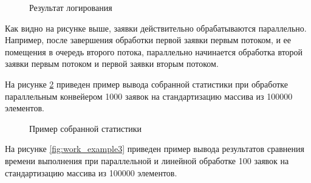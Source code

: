\begin{figure}[h!]
	
	
	\caption{Результат логирования}
	
	\label{fig:work_example2}
	
\end{figure}


Как видно на рисунке выше, заявки действительно обрабатываются параллельно. Например, после завершения обработки первой заявки первым потоком, и ее помещения в очередь второго потока, параллельно начинается обработка второй заявки первым потоком и первой заявки вторым потоком.

На рисунке \ref{fig:stats2} приведен пример вывода собранной статистики при обработке параллельным конвейером 1000 заявок на стандартизацию массива из 100000 элементов.

\begin{figure}[h!]
	
	
	\caption{Пример собранной статистики}
	
	\label{fig:stats2}
	
\end{figure}


\newpage
На рисунке \ref{fig:work_example3} приведен пример вывода результатов сравнения времени выполнения при параллельной и линейной обработке 100 заявок на стандартизацию массива из 100000 элементов. 


